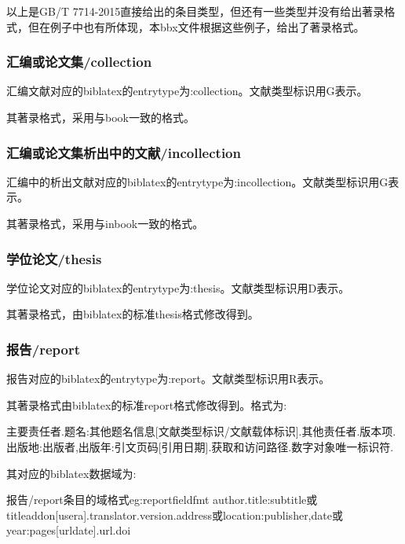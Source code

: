 以上是GB/T 7714-2015直接给出的条目类型，但还有一些类型并没有给出著录格式，但在例子中也有所体现，本bbx文件根据这些例子，给出了著录格式。

\subsubsection{汇编或论文集/collection}

\begin{refentry}{}{}
汇编文献对应的biblatex的entrytype为:collection。文献类型标识用G表示。

其著录格式，采用与book一致的格式。
\end{refentry}

\subsubsection{汇编或论文集析出中的文献/incollection}
\begin{refentry}{}{}
汇编中的析出文献对应的biblatex的entrytype为:incollection。文献类型标识用G表示。

其著录格式，采用与inbook一致的格式。
\end{refentry}

\subsubsection{学位论文/thesis}
\begin{refentry}{}{}
学位论文对应的biblatex的entrytype为:thesis。文献类型标识用D表示。

其著录格式，由biblatex的标准thesis格式修改得到。
\end{refentry}

\subsubsection{报告/report}
\begin{refentry}{}{}
报告对应的biblatex的entrytype为:report。文献类型标识用R表示。

其著录格式由biblatex的标准report格式修改得到。格式为:

主要责任者.题名:其他题名信息[文献类型标识/文献载体标识].其他责任者.版本项.出版地:出版者,出版年:引文页码[引用日期].获取和访问路径.数字对象唯一标识符.
\end{refentry}

其对应的biblatex数据域为:
\begin{codetex}{报告/report条目的域格式}{eg:reportfieldfmt}
author.title:subtitle或titleaddon[usera].translator.version.address或location:publisher,date或year:pages[urldate].url.doi
\end{codetex}


